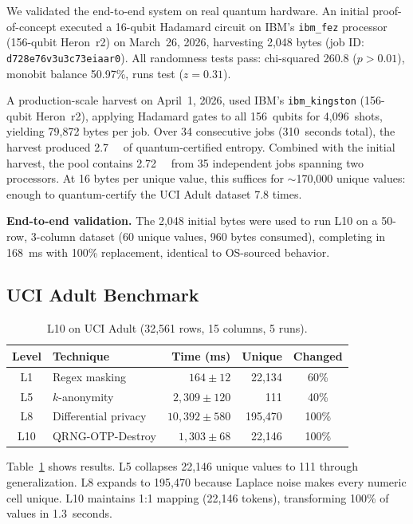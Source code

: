 \documentclass[acmsmall,screen,review,anonymous]{acmart}
\begin{document}
We validated the end-to-end system on real quantum hardware. An initial proof-of-concept executed a 16-qubit Hadamard circuit on IBM's \texttt{ibm\_fez} processor (156-qubit Heron~r2) on March~26, 2026, harvesting 2,048 bytes (job ID: \texttt{d728e76v3u3c73eiaar0}). All randomness tests pass: chi-squared 260.8 ($p > 0.01$), monobit balance 50.97\%, runs test ($z = 0.31$).

A production-scale harvest on April~1, 2026, used IBM's \texttt{ibm\_kingston} (156-qubit Heron~r2), applying Hadamard gates to all 156~qubits for 4,096~shots, yielding 79,872 bytes per job. Over 34 consecutive jobs (310~seconds total), the harvest produced \SI{2.7}{\mega\byte} of quantum-certified entropy. Combined with the initial harvest, the pool contains \SI{2.72}{\mega\byte} from 35 independent jobs spanning two processors. At 16 bytes per unique value, this suffices for ${\sim}$170,000 unique values: enough to quantum-certify the UCI Adult dataset 7.8 times.

\textbf{End-to-end validation.} The 2,048 initial bytes were used to run L10 on a 50-row, 3-column dataset (60 unique values, 960 bytes consumed), completing in 168~ms with 100\% replacement, identical to OS-sourced behavior.

\subsection{UCI Adult Benchmark}

\begin{table}[t]
\caption{L10 on UCI Adult (32,561 rows, 15 columns, 5 runs).}
\label{tab:adult}
\begin{center}
\begin{tabular}{@{}clrrc@{}}
\toprule
\textbf{Level} & \textbf{Technique} & \textbf{Time (ms)} & \textbf{Unique} & \textbf{Changed} \\
\midrule
L1  & Regex masking        &  $164 \pm 12$ & 22,134 &  60\% \\
L5  & $k$-anonymity        & $2{,}309 \pm 120$ &    111 &  40\% \\
L8  & Differential privacy & $10{,}392 \pm 580$ & 195,470 & 100\% \\
L10 & QRNG-OTP-Destroy     & $1{,}303 \pm 68$ & 22,146 & 100\% \\
\bottomrule
\end{tabular}
\end{center}
\end{table}

Table~\ref{tab:adult} shows results. L5 collapses 22,146 unique values to 111 through generalization. L8 expands to 195,470 because Laplace noise makes every numeric cell unique. L10 maintains 1:1 mapping (22,146 tokens), transforming 100\% of values in 1.3~seconds.
\end{document}
